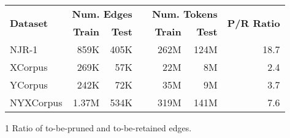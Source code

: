 \begin{threeparttable}
\begin{tabular}{@{}l rr c rr r@{}}
\toprule
\multirow{2}{*}{\textbf{Dataset}} & \multicolumn{2}{c}{\textbf{Num. Edges}} && \multicolumn{2}{c}{\textbf{Num. Tokens}} & \multirow{2}{*}{\textbf{P/R Ratio}}\tnote{1} \\
\cmidrule{2-3} \cmidrule{5-6}
 & \textbf{Train} & \textbf{Test} && \textbf{Train} & \textbf{Test} & \\
\midrule
NJR-1 & 859K & 405K && 262M & 124M & 18.7 \\
XCorpus & 269K & 57K && 22M & 8M & 2.4 \\
YCorpus & 242K & 72K && 35M & 9M & 3.7 \\
NYXCorpus & 1.37M & 534K && 319M & 141M & 7.6 \\
\bottomrule
\end{tabular}
\begin{tablenotes}
\item[1] Ratio of to-be-pruned and to-be-retained edges.
\end{tablenotes}
\end{threeparttable}
